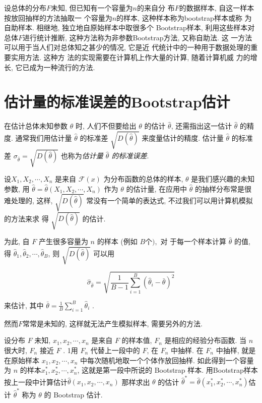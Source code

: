设总体的分布$F$未知, 但已知有一个容量为$n$的来自分
布$F$的数据样本, 自这一样本按放回抽样的方法抽取一
个容量为$n$的样本, 这种样本称为bootstrap样本或称
为自助样本. 相继地, 独立地自原始样本中取很多个
Bootstrap样本, 利用这些样本对总体$F$进行统计推断, 
这种方法称为非参数Bootstrap方法, 又称自助法. 这
一方法可以用于当人们对总体知之甚少的情况, 它是近
代统计中的一种用于数据处理的重要实用方法. 这种方
法的实现需要在计算机上作大量的计算, 随着计算机威
力的增长, 它已成为一种流行的方法. 

\section{估计量的标准误差的Bootstrap估计}

在估计总体未知参数 $ \theta $ 时, 人们不但要给出 $ \theta $ 的估计 $ \hat{\theta} $, 还需指出这一估计 $ \hat{\theta} $ 的精度. 通常我们用估计量 $ \hat{\theta} $
的标准差 $ \sqrt{D(\hat{\theta})} $ 来度量估计的精度. 估计量 $ \hat{\theta} $ 的标准差 $ \sigma_{\hat{\theta}}=\sqrt{D(\hat{\theta})} $ 也称为\textit{估计量 $ \hat{\theta} $ 的标准误差}. 

设$ {X}_{1}, {X}_{2}, \cdots, X_{n} $ 是来自 $ \mathcal{F}(x) $ 为分布函数的总体的样本, $ \theta $ 是我们感兴趣的未知参数, 用 $ \hat{{\theta}}=\hat{{\theta}}\left({X}_{1}, {X}_{2}, \cdots, {X}_{n}\right) $ 作为 $ \theta $ 的估计量, 在应用中 $ \hat{\theta} $ 的抽样分布常是很难处理的, 这样, $ \sqrt{D(\hat{\theta})} $ 常没有一个简单的表达式, 不过我们可以用计算机模拟的方法来求 得 $ \sqrt{D(\hat{\theta})} $ 的估计. 

为此, 自 $ {F} $ 产生很多容量为 $ {n} $ 的样本 (例如 $ {B 个 ) ,} $ 对 于每一个样本计算 $ \hat{\theta} $ 的值, 得 $ \hat{\theta}_{1}, \hat{\theta}_{2}, \cdots, \hat{\theta}_{B} $, 则 $ \sqrt{D(\hat{\theta})} $ 可以用

$$ \hat{\sigma}_{\hat{\theta}}=\sqrt{\frac{1}{B-1} \sum_{i=1}^{B}\left(\hat{\theta}_{i}-\bar{\theta}\right)^{2}} $$

来估计, 其中 $ \bar{\theta}=\frac{1}{B} \sum_{i=1}^{B} \hat{\theta}_{i} $ . 

然而$F$常常是未知的, 这样就无法产生模拟样本, 需要另外的方法. 

设分布 $ F $ 未知, $ x_{1}, x_{2}, \cdots, x_{n} $ 是来自 $ F $ 的样本值, $ {F}_{n} $ 是相应的经验分布函数. 当 $ n $ 很大时, $ F_{n} $ 接近 $ F $ . 1用 $ F_{n} $ 代替上一段中的 $ F $, 在 $ F_{n} $ 中抽样. 在 $ F_{n} $ 中抽样, 就是在原始样本 $ {x}_{1}, {x}_{2}, \cdots, {x}_{n} $ 中每次随机地取一个个体作放回抽样. 如此得到一个容量为 $ {n} $ 的样本$ {x}_{1}^{*}, {x}_{2}^{*}, \cdots, {x}_{n}^{*} $, 这就是第一段中所说的 Bootstrap 样本. 用Bootstrap样本按上一段中计算估计$ \hat{\theta}\left(x_{1}, x_{2}, \cdots, x_{n}\right) $ 那样求出 $ \theta $ 的估计 $ \hat{\theta}^{*}=\hat{\theta}\left(x_{1}^{*}, x_{2}^{*}, \cdots, x_{n}^{*}\right) $估计 $ \hat{\theta}^{*} $ 称为 $ \theta $ 的 Bootstrap 估计. 



